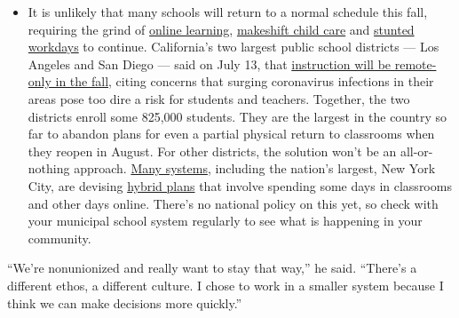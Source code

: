\begin{itemize}
  \begin{itemize}
  \tightlist
  \item
    It is unlikely that many schools will return to a normal schedule
    this fall, requiring the grind of
    \href{https://www.nytimes3xbfgragh.onion/2020/06/05/us/coronavirus-education-lost-learning.html?action=click\&pgtype=Article\&state=default\&region=MAIN_CONTENT_3\&context=storylines_faq}{online
    learning},
    \href{https://www.nytimes3xbfgragh.onion/2020/05/29/us/coronavirus-child-care-centers.html?action=click\&pgtype=Article\&state=default\&region=MAIN_CONTENT_3\&context=storylines_faq}{makeshift
    child care} and
    \href{https://www.nytimes3xbfgragh.onion/2020/06/03/business/economy/coronavirus-working-women.html?action=click\&pgtype=Article\&state=default\&region=MAIN_CONTENT_3\&context=storylines_faq}{stunted
    workdays} to continue. California's two largest public school
    districts --- Los Angeles and San Diego --- said on July 13, that
    \href{https://www.nytimes3xbfgragh.onion/2020/07/13/us/lausd-san-diego-school-reopening.html?action=click\&pgtype=Article\&state=default\&region=MAIN_CONTENT_3\&context=storylines_faq}{instruction
    will be remote-only in the fall}, citing concerns that surging
    coronavirus infections in their areas pose too dire a risk for
    students and teachers. Together, the two districts enroll some
    825,000 students. They are the largest in the country so far to
    abandon plans for even a partial physical return to classrooms when
    they reopen in August. For other districts, the solution won't be an
    all-or-nothing approach.
    \href{https://bioethics.jhu.edu/research-and-outreach/projects/eschool-initiative/school-policy-tracker/}{Many
    systems}, including the nation's largest, New York City, are
    devising
    \href{https://www.nytimes3xbfgragh.onion/2020/06/26/us/coronavirus-schools-reopen-fall.html?action=click\&pgtype=Article\&state=default\&region=MAIN_CONTENT_3\&context=storylines_faq}{hybrid
    plans} that involve spending some days in classrooms and other days
    online. There's no national policy on this yet, so check with your
    municipal school system regularly to see what is happening in your
    community.
  \end{itemize}
\end{itemize}

``We're nonunionized and really want to stay that way,'' he said.
``There's a different ethos, a different culture. I chose to work in a
smaller system because I think we can make decisions more quickly.''

